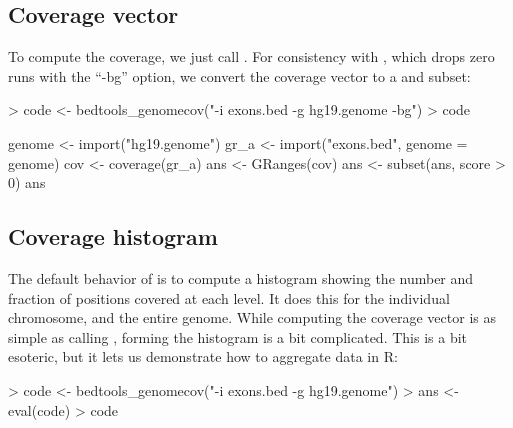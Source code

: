 \documentclass[10pt]{article}
\begin{document}
\subsection{Coverage vector}

To compute the coverage, we just call . For
consistency with , which drops zero runs with the
``-bg'' option, we convert the coverage vector to a 
and subset:
\begin{Schunk}
\begin{Sinput}
> code <- bedtools_genomecov("-i exons.bed -g hg19.genome -bg")
> code
\end{Sinput}
\begin{Soutput}
{
    genome <- import("hg19.genome")
    gr_a <- import("exons.bed", genome = genome)
    cov <- coverage(gr_a)
    ans <- GRanges(cov)
    ans <- subset(ans, score > 0)
    ans
}
\end{Soutput}
\end{Schunk}

\subsection{Coverage histogram}

The default behavior of  is to compute a histogram
showing the number and fraction of positions covered at each level. It
does this for the individual chromosome, and the entire genome. While
computing the coverage vector is as simple as calling
, forming the histogram is a bit
complicated. This is a bit esoteric, but it lets us
demonstrate how to aggregate data in R:
\begin{Schunk}
\begin{Sinput}
> code <- bedtools_genomecov("-i exons.bed -g hg19.genome")
> ans <- eval(code)
> code
\end{Sinput}
\end{Schunk}
%
\end{document}

